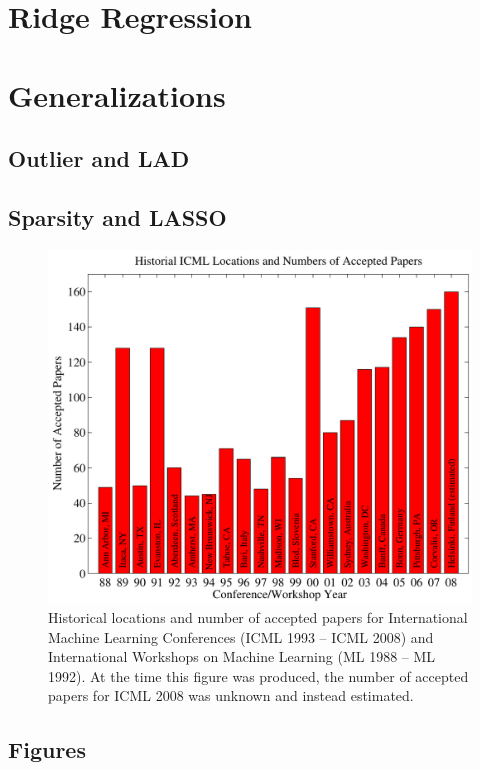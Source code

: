 \documentclass{article}
\begin{document}
\section{Ridge Regression} 

\section{Generalizations}
\subsection{Outlier and LAD}
\subsection{Sparsity and LASSO}

\begin{figure}[ht]
\vskip 0.2in
\begin{center}
\centerline{\includegraphics[width=\columnwidth]{icml_numpapers}}
\caption{Historical locations and number of accepted papers for International
  Machine Learning Conferences (ICML 1993 -- ICML 2008) and
  International Workshops on Machine Learning (ML 1988 -- ML
  1992). At the time this figure was produced, the number of
  accepted papers for ICML 2008 was unknown and instead estimated.}
\label{icml-historical}
\end{center}
\vskip -0.2in
\end{figure} 

\subsection{Figures}
 
\end{document}
